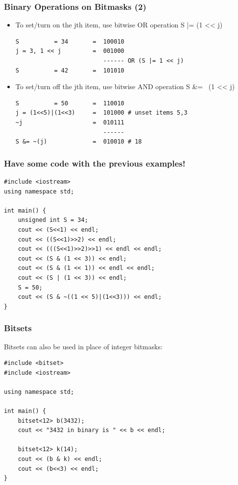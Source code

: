 \documentclass{beamer}
\begin{document}
\begin{frame}
  \frametitle{Binary Operations on Bitmasks (2)}
  {\smaller
  \begin{itemize}
  \item To set/turn on the jth item, use bitwise OR operation S |= (1 << j)
\begin{verbatim}
S          = 34       =  100010
j = 3, 1 << j         =  001000
                         ------ OR (S |= 1 << j)
S          = 42       =  101010
\end{verbatim}
\item To set/turn off the jth item, use bitwise AND operation S \&= ~(1 << j)
\begin{verbatim}
S          = 50       =  110010
j = (1<<5)|(1<<3)     =  101000 # unset items 5,3 
~j                    =  010111
                         ------
S &= ~(j)             =  010010 # 18
\end{verbatim}
  \end{itemize}

  }
\end{frame}

\begin{frame}
  \frametitle{Have some code with the previous examples!}
  {\smaller
\begin{verbatim}
#include <iostream>
using namespace std;

int main() {
    unsigned int S = 34;    
    cout << (S<<1) << endl;
    cout << ((S<<1)>>2) << endl;
    cout << (((S<<1)>>2)>>1) << endl << endl;    
    cout << (S & (1 << 3)) << endl;
    cout << (S & (1 << 1)) << endl << endl;    
    cout << (S | (1 << 3)) << endl;    
    S = 50;
    cout << (S & ~((1 << 5)|(1<<3))) << endl;
}
\end{verbatim}

  }

\end{frame}




\begin{frame}
  \frametitle{Bitsets}
  {\smaller

  Bitsets can also be used in place of integer bitmasks:

  \begin{block}{}
\begin{verbatim}
#include <bitset>
#include <iostream>

using namespace std;

int main() {
    bitset<12> b(3432);
    cout << "3432 in binary is " << b << endl;
    
    bitset<12> k(14);
    cout << (b & k) << endl;
    cout << (b<<3) << endl;
}
\end{verbatim}
  \end{block}
  }
\end{frame}
\end{document}

